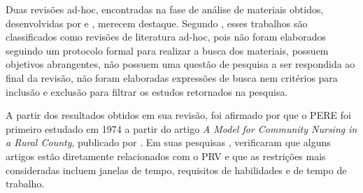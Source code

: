 Duas revisões ad-hoc, encontradas na fase de análise de materiais obtidos, desenvolvidas por  e , merecem destaque. Segundo , esses trabalhos são classificados como revisões de literatura ad-hoc, pois não foram elaborados seguindo um protocolo formal para realizar a busca dos materiais, possuem objetivos abrangentes, não possuem uma questão de pesquisa a ser respondida ao final da revisão, não foram elaboradas expressões de busca nem critérios para inclusão e exclusão para filtrar os estudos retornados na pesquisa. 

A partir dos resultados obtidos em sua revisão, foi afirmado por  que o \ac{PERE} foi primeiro estudado em 1974 a partir do artigo \textit{A Model for Community Nursing in a Rural County}, publicado por . Em suas pesquisas , verificaram  que alguns artigos estão diretamente relacionados com o \ac{PRV} e que as restrições mais consideradas incluem janelas de tempo, requisitos de habilidades e de tempo de trabalho. 







